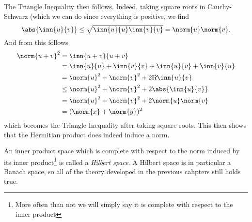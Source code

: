 \documentclass[12pt,oneside]{book}
\begin{document}
The Triangle Inequality then follows. Indeed, taking square roots in Cauchy-Schwarz (which
we can do since everything is positive, we find
\begin{equation*}
	\abs{\inn{u}{v}} \leq \sqrt{\inn{u}{u} \inn{v}{v}} = \norm{u} \norm{v}.
\end{equation*}
And from this follows
\begin{align*}
	\norm{u + v}^2 & = \inn{u + v}{u + v} \\
								 & = \inn{u}{u} + \inn{v}{v} + \inn{u}{v} + \inn{v}{u} \\
								 & = \norm{u}^2 + \norm{v}^2 + 2 \Re \inn{u}{v} \\
								 & \leq \norm{u}^2 + \norm{v}^2 + 2\abs{\inn{u}{v}} \\
								 & = \norm{u}^2 + \norm{v}^2 + 2\norm{u}\norm{v} \\
								 & = (\norm{x} + \norm{y})^2
\end{align*}
which becomes the Triangle Inequality after taking square roots. This then shows that the
Hermitian product does indeed induce a norm.

An inner product space which is complete with respect to the norm induced by its inner
product\footnote{More often than not we will simply say it is complete with respect to the
inner product} is called a \emph{Hilbert space}. A Hilbert space is in particular a Banach
space, so all of the theory developed in the previous cahpters still holds true.

\parbreak
\end{document}
